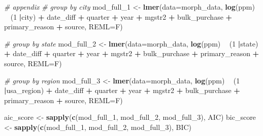 \documentclass[
  11pt,
]{article}
\newenvironment{Shaded}{\begin{snugshade}}{\end{snugshade}}
\newcommand{\CommentTok}[1]{\textcolor[rgb]{0.56,0.35,0.01}{\textit{#1}}}
\newcommand{\DataTypeTok}[1]{\textcolor[rgb]{0.13,0.29,0.53}{#1}}
\newcommand{\DecValTok}[1]{\textcolor[rgb]{0.00,0.00,0.81}{#1}}
\newcommand{\KeywordTok}[1]{\textcolor[rgb]{0.13,0.29,0.53}{\textbf{#1}}}
\newcommand{\NormalTok}[1]{#1}
\newcommand{\OperatorTok}[1]{\textcolor[rgb]{0.81,0.36,0.00}{\textbf{#1}}}
\newcommand{\StringTok}[1]{\textcolor[rgb]{0.31,0.60,0.02}{#1}}
\begin{document}
\begin{Shaded}
\begin{Highlighting}[]
\CommentTok{# appendix}
\CommentTok{# group by city}
\NormalTok{mod_full_}\DecValTok{1}\NormalTok{ <-}\StringTok{ }\KeywordTok{lmer}\NormalTok{(}\DataTypeTok{data=}\NormalTok{morph_data, }\KeywordTok{log}\NormalTok{(ppm) }\OperatorTok{~}\StringTok{ }\NormalTok{(}\DecValTok{1} \OperatorTok{|}\NormalTok{city) }\OperatorTok{+}\StringTok{ }\NormalTok{date_diff }\OperatorTok{+}\StringTok{ }\NormalTok{quarter }
                   \OperatorTok{+}\StringTok{ }\NormalTok{year }\OperatorTok{+}\StringTok{ }\NormalTok{mgstr2 }\OperatorTok{+}
\StringTok{                }\NormalTok{bulk_purchase }\OperatorTok{+}\StringTok{ }\NormalTok{primary_reason }\OperatorTok{+}\StringTok{ }\NormalTok{source, }\DataTypeTok{REML=}\NormalTok{F)}

\CommentTok{# group by state}
\NormalTok{mod_full_}\DecValTok{2}\NormalTok{ <-}\StringTok{ }\KeywordTok{lmer}\NormalTok{(}\DataTypeTok{data=}\NormalTok{morph_data, }\KeywordTok{log}\NormalTok{(ppm) }\OperatorTok{~}\StringTok{ }\NormalTok{(}\DecValTok{1} \OperatorTok{|}\NormalTok{state) }\OperatorTok{+}\StringTok{ }\NormalTok{date_diff }\OperatorTok{+}\StringTok{ }\NormalTok{quarter }
                   \OperatorTok{+}\StringTok{ }\NormalTok{year }\OperatorTok{+}\StringTok{ }\NormalTok{mgstr2 }\OperatorTok{+}
\StringTok{                }\NormalTok{bulk_purchase }\OperatorTok{+}\StringTok{ }\NormalTok{primary_reason }\OperatorTok{+}\StringTok{ }\NormalTok{source, }\DataTypeTok{REML=}\NormalTok{F)}

\CommentTok{# group by region}
\NormalTok{mod_full_}\DecValTok{3}\NormalTok{ <-}\StringTok{ }\KeywordTok{lmer}\NormalTok{(}\DataTypeTok{data=}\NormalTok{morph_data, }\KeywordTok{log}\NormalTok{(ppm) }\OperatorTok{~}\StringTok{ }\NormalTok{(}\DecValTok{1} \OperatorTok{|}\NormalTok{usa_region) }\OperatorTok{+}\StringTok{ }\NormalTok{date_diff }\OperatorTok{+}\StringTok{ }
\StringTok{                     }\NormalTok{quarter }\OperatorTok{+}\StringTok{ }\NormalTok{year }\OperatorTok{+}\StringTok{ }\NormalTok{mgstr2 }\OperatorTok{+}
\StringTok{                }\NormalTok{bulk_purchase }\OperatorTok{+}\StringTok{ }\NormalTok{primary_reason }\OperatorTok{+}\StringTok{ }\NormalTok{source, }\DataTypeTok{REML=}\NormalTok{F)}

\NormalTok{aic_score <-}\StringTok{ }\KeywordTok{sapply}\NormalTok{(}\KeywordTok{c}\NormalTok{(mod_full_}\DecValTok{1}\NormalTok{, mod_full_}\DecValTok{2}\NormalTok{, mod_full_}\DecValTok{3}\NormalTok{), AIC)}
\NormalTok{bic_score <-}\StringTok{ }\KeywordTok{sapply}\NormalTok{(}\KeywordTok{c}\NormalTok{(mod_full_}\DecValTok{1}\NormalTok{, mod_full_}\DecValTok{2}\NormalTok{, mod_full_}\DecValTok{3}\NormalTok{), BIC)}


\end{Highlighting}
\end{Shaded}
\end{document}

